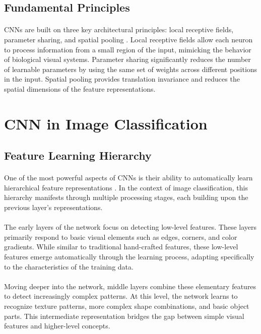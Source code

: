 \subsection{Fundamental Principles}
\paragraph{}
CNNs are built on three key architectural principles: local receptive fields, parameter sharing, and spatial pooling \cite{goodfellow2016deep}. Local receptive fields allow each neuron to process information from a small region of the input, mimicking the behavior of biological visual systems. Parameter sharing significantly reduces the number of learnable parameters by using the same set of weights across different positions in the input. Spatial pooling provides translation invariance and reduces the spatial dimensions of the feature representations.

\section{CNN in Image Classification}
\label{sec:cnn-image-classification}

\subsection{Feature Learning Hierarchy}
\paragraph{}
One of the most powerful aspects of CNNs is their ability to automatically learn hierarchical feature representations \cite{zeiler2014visualizing}. In the context of image classification, this hierarchy manifests through multiple processing stages, each building upon the previous layer's representations.

\paragraph{}
The early layers of the network focus on detecting low-level features. These layers primarily respond to basic visual elements such as edges, corners, and color gradients. While similar to traditional hand-crafted features, these low-level features emerge automatically through the learning process, adapting specifically to the characteristics of the training data.

\paragraph{}
Moving deeper into the network, middle layers combine these elementary features to detect increasingly complex patterns. At this level, the network learns to recognize texture patterns, more complex shape combinations, and basic object parts. This intermediate representation bridges the gap between simple visual features and higher-level concepts.

